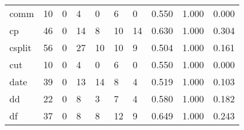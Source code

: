 \begin{longtable}{lp{2.0cm}p{2.0cm}p{2.0cm}p{2.0cm}p{2.0cm}p{2.0cm}p{2.0cm}p{2.0cm}p{2.0cm}}
comm      &                     10 &                                             0 &                                            4 &                                           0 &                                            6 &                                          0 &                                0.550 &                                  1.000 &                                0.000 \\
cp        &                     46 &                                             0 &                                           14 &                                           8 &                                           10 &                                         14 &                                0.630 &                                  1.000 &                                0.304 \\
csplit    &                     56 &                                             0 &                                           27 &                                          10 &                                           10 &                                          9 &                                0.504 &                                  1.000 &                                0.161 \\
cut       &                     10 &                                             0 &                                            4 &                                           0 &                                            6 &                                          0 &                                0.550 &                                  1.000 &                                0.000 \\
date      &                     39 &                                             0 &                                           13 &                                          14 &                                            8 &                                          4 &                                0.519 &                                  1.000 &                                0.103 \\
dd        &                     22 &                                             0 &                                            8 &                                           3 &                                            7 &                                          4 &                                0.580 &                                  1.000 &                                0.182 \\
df        &                     37 &                                             0 &                                            8 &                                           8 &                                           12 &                                          9 &                                0.649 &                                  1.000 &                                0.243 \\

\end{longtable}
